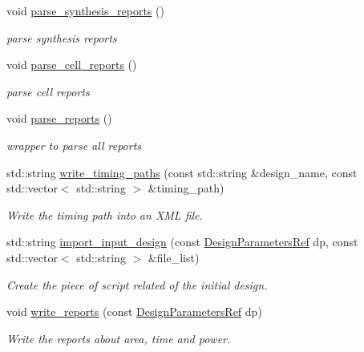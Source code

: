 \begin{DoxyCompactItemize}
void \hyperlink{classDesignCompilerWrapper_a251f045b7fa693969e0a867f3751f8a5}{parse\+\_\+synthesis\+\_\+reports} ()
\begin{DoxyCompactList}\small\item\em parse synthesis reports \end{DoxyCompactList}\item 
void \hyperlink{classDesignCompilerWrapper_a02ce587a350321c1d587beb1fd3810af}{parse\+\_\+cell\+\_\+reports} ()
\begin{DoxyCompactList}\small\item\em parse cell reports \end{DoxyCompactList}\item 
void \hyperlink{classDesignCompilerWrapper_a7a64611e48e20a4cf7f3dc3e6f4fcfcd}{parse\+\_\+reports} ()
\begin{DoxyCompactList}\small\item\em wrapper to parse all reports \end{DoxyCompactList}\item 
std\+::string \hyperlink{classDesignCompilerWrapper_a06e7903a56b7f2dbd6476516a1310d65}{write\+\_\+timing\+\_\+paths} (const std\+::string \&design\+\_\+name, const std\+::vector$<$ std\+::string $>$ \&timing\+\_\+path)
\begin{DoxyCompactList}\small\item\em Write the timing path into an X\+ML file. \end{DoxyCompactList}\item 
std\+::string \hyperlink{classDesignCompilerWrapper_a216d4d77a0f799e699915650fdc58d5b}{import\+\_\+input\+\_\+design} (const \hyperlink{DesignParameters_8hpp_ae36bb1c4c9150d0eeecfe1f96f42d157}{Design\+Parameters\+Ref} dp, const std\+::vector$<$ std\+::string $>$ \&file\+\_\+list)
\begin{DoxyCompactList}\small\item\em Create the piece of script related of the initial design. \end{DoxyCompactList}\item 
void \hyperlink{classDesignCompilerWrapper_aaaab9f8ed8fe034f03fed958b21fdf36}{write\+\_\+reports} (const \hyperlink{DesignParameters_8hpp_ae36bb1c4c9150d0eeecfe1f96f42d157}{Design\+Parameters\+Ref} dp)
\begin{DoxyCompactList}\small\item\em Write the reports about area, time and power. \end{DoxyCompactList}\item 

\end{DoxyCompactItemize}
